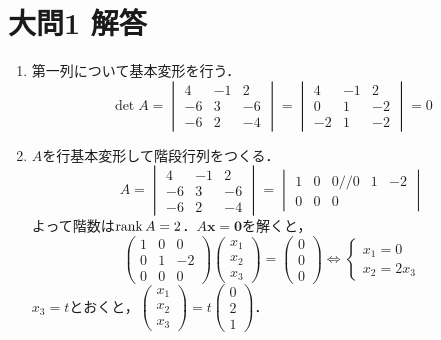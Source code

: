 \documentclass[dvipdfmx]{jsreport}
\begin{document}
\section{大問1 解答}
\begin{souanswer} %
\begin{enumerate}
  \item 第一列について基本変形を行う．
\begin{equation*}
  \det{A}= 
\begin{vmatrix}
  4& -1& 2\\
  -6& 3& -6\\
  -6& 2& -4
\end{vmatrix}= 
\begin{vmatrix}
  4& -1& 2\\
  0& 1& -2\\
  -2& 1& -2
\end{vmatrix}= 0
\end{equation*}
  \item $A$を行基本変形して階段行列をつくる．
\begin{equation*}
  A= 
\begin{vmatrix}
  4& -1& 2\\
  -6& 3& -6\\
  -6& 2& -4
\end{vmatrix}= 
\begin{vmatrix}
  1& 0& 0//
  0& 1& -2\\
  0& 0& 0
\end{vmatrix}
\end{equation*}
  よって階数は$\operatorname{rank}{A}= 2$．$A\bm{x}= \bm{0}$を解くと，
\begin{equation*}
\begin{pmatrix}
  1& 0& 0\\
  0& 1& -2\\
  0& 0& 0
\end{pmatrix}\begin{pmatrix}x_1\\ x_2\\ x_3\end{pmatrix}= \begin{pmatrix}0\\ 0\\ 0\end{pmatrix}
  \iff \begin{cases}x_1= 0\\ x_2= 2x_3\end{cases}
\end{equation*}
  $x_3= t$とおくと，$\begin{pmatrix}x_1\\ x_2\\ x_3\end{pmatrix}= t\begin{pmatrix}0\\ 2\\ 1\end{pmatrix}$．\\

\end{enumerate}
\end{souanswer}
\end{document}
